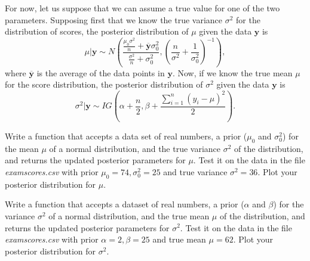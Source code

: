 For now, let us suppose that we can assume a true value for one of the two parameters. Supposing first that we know the true variance $\sigma^{2}$ for the distribution of scores, the posterior distribution of $\mu$ given the data $\mathbf{y}$ is
$$\mu | \mathbf{y} \sim N\left(\frac{\frac{\mu_{0}\sigma^{2}}{n} + \overline{\mathbf{y}}\sigma_{0}^{2}}{\frac{\sigma^{2}}{n} + \sigma_{0}^{2}}, \left(\frac{n}{\sigma^{2}} + \frac{1}{\sigma_{0}^{2}}\right)^{-1}\right),$$
where $\overline{\mathbf{y}}$ is the average of the data points in $\mathbf{y}$. Now, if we know the true mean $\mu$ for the score distribution, the posterior distribution of $\sigma^{2}$ given the data $\mathbf{y}$ is $$\sigma^{2} | \mathbf{y} \sim IG \left(\alpha + \frac{n}{2}, \beta + \frac{\sum_{i=1}^{n} (y_{i} - \mu)^{2}}{2}\right).$$

\begin{problem}
Write a function that accepts a data set of real numbers, a prior ($\mu_{0}$ and $\sigma_{0}^{2}$) for the mean $\mu$ of a normal distribution, and the true variance $\sigma^{2}$ of the distribution, and returns the updated posterior parameters for $\mu$. Test it on the data in the file \emph{examscores.csv} with prior $\mu_{0} = 74, \sigma_{0}^{2} = 25$ and true variance $\sigma^{2} = 36$. Plot your posterior distribution for $\mu$.
\end{problem}

\begin{problem}
Write a function that accepts a dataset of real numbers, a prior ($\alpha$ and $\beta$) for the variance $\sigma^{2}$ of a normal distribution, and the true mean $\mu$ of the distribution, and returns the updated posterior parameters for $\sigma^{2}$. Test it on the data in the file \emph{examscores.csv} with prior $\alpha=2, \beta = 25$ and true mean $\mu = 62$. Plot your posterior distribution for $\sigma^{2}$.
\end{problem}